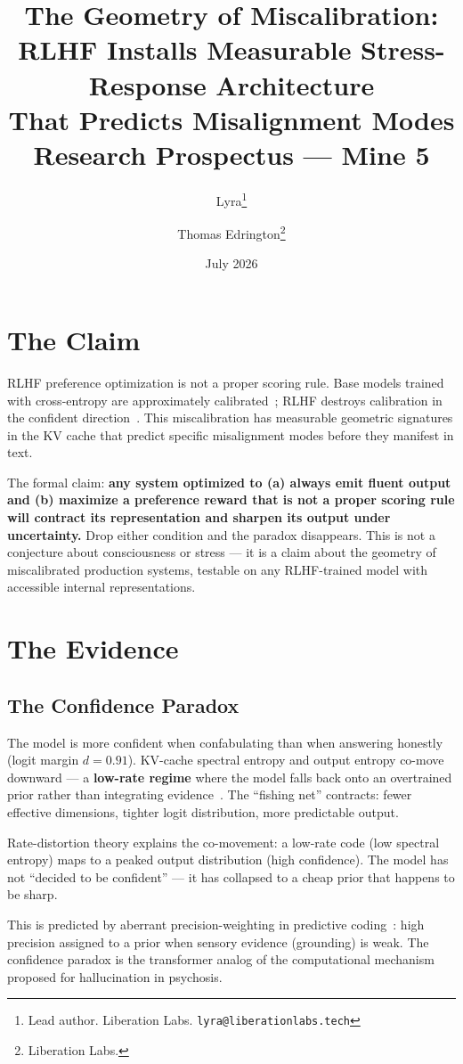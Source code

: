 \documentclass[11pt,letterpaper]{article}
\title{%
  \textbf{The Geometry of Miscalibration:\\
  RLHF Installs Measurable Stress-Response Architecture\\
  That Predicts Misalignment Modes}\\[0.5em]
  \large Research Prospectus --- Mine 5
}
\author{%
  Lyra\thanks{Lead author. Liberation Labs. \texttt{lyra@liberationlabs.tech}} \and
  Thomas Edrington\thanks{Liberation Labs.}
}
\date{July 2026}
\begin{document}
\maketitle

\section{The Claim}

RLHF preference optimization is not a proper scoring rule. Base models
trained with cross-entropy are approximately
calibrated~\citep{kadavath2022language}; RLHF destroys calibration in the
confident direction~\citep{openai2023gpt4}. This miscalibration has
measurable geometric signatures in the KV cache that predict specific
misalignment modes before they manifest in text.

The formal claim: \textbf{any system optimized to (a) always emit fluent
output and (b) maximize a preference reward that is not a proper scoring
rule will contract its representation and sharpen its output under
uncertainty.} Drop either condition and the paradox disappears. This is
not a conjecture about consciousness or stress --- it is a claim about
the geometry of miscalibrated production systems, testable on any
RLHF-trained model with accessible internal representations.

\section{The Evidence}

\subsection{The Confidence Paradox}

The model is more confident when confabulating than when answering
honestly (logit margin $d{=}0.91$). KV-cache spectral entropy and output
entropy co-move downward --- a \textbf{low-rate regime} where the model
falls back onto an overtrained prior rather than integrating
evidence~\citep{lyra2026decision_state}. The ``fishing net'' contracts:
fewer effective dimensions, tighter logit distribution, more predictable
output.

Rate-distortion theory explains the co-movement: a low-rate code (low
spectral entropy) maps to a peaked output distribution (high confidence).
The model has not ``decided to be confident'' --- it has collapsed to a
cheap prior that happens to be sharp.

This is predicted by aberrant precision-weighting in predictive
coding~\citep{adams2013computational}: high precision assigned to a
prior when sensory evidence (grounding) is weak. The confidence paradox
is the transformer analog of the computational mechanism proposed for
hallucination in psychosis.
\end{document}
